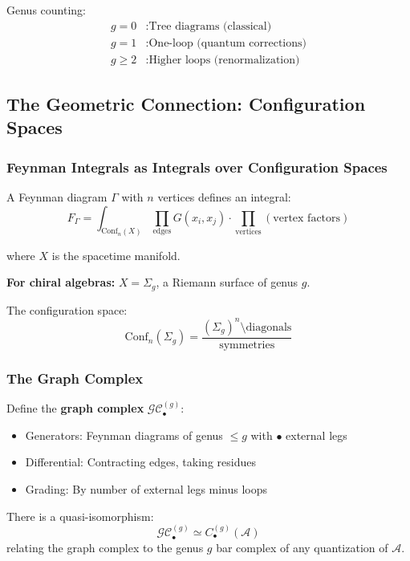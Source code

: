 Genus counting:
\begin{align}
g=0 &: \text{Tree diagrams (classical)} \\
g=1 &: \text{One-loop (quantum corrections)} \\
g \geq 2 &: \text{Higher loops (renormalization)}
\end{align}

\subsection{The Geometric Connection: Configuration Spaces}

\subsubsection{Feynman Integrals as Integrals over Configuration Spaces}

A Feynman diagram $\Gamma$ with $n$ vertices defines an integral:
$$F_{\Gamma} = \int_{\mathrm{Conf}_n(X)} \prod_{\text{edges}} G(x_i, x_j) 
\cdot \prod_{\text{vertices}} (\text{vertex factors})$$

where $X$ is the spacetime manifold.

\textbf{For chiral algebras:} $X = \Sigma_g$, a Riemann surface of genus $g$.

The configuration space:
$$\mathrm{Conf}_n(\Sigma_g) = \frac{(\Sigma_g)^n \setminus \text{diagonals}}{\text{symmetries}}$$

\subsubsection{The Graph Complex}

Define the \textbf{graph complex} $\mathcal{GC}_{\bullet}^{(g)}$:
\begin{itemize}
\item Generators: Feynman diagrams of genus $\leq g$ with $\bullet$ external legs
\item Differential: Contracting edges, taking residues
\item Grading: By number of external legs minus loops
\end{itemize}

\begin{theorem}[Kontsevich]
There is a quasi-isomorphism:
$$\mathcal{GC}_{\bullet}^{(g)} \simeq C_{\bullet}^{(g)}(\mathcal{A})$$
relating the graph complex to the genus $g$ bar complex of any quantization of $\mathcal{A}$.
\end{theorem}

